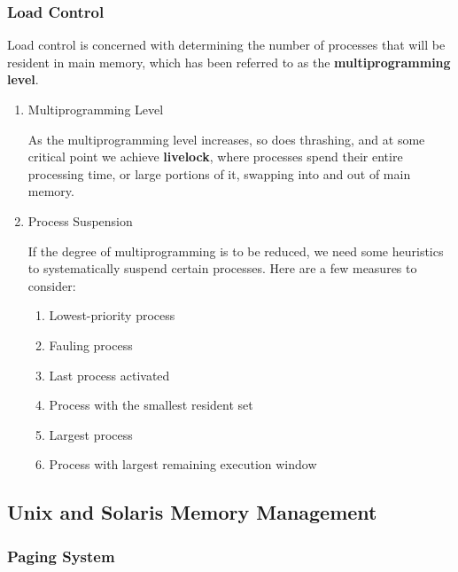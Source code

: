 \documentclass[11pt]{article}
\begin{document}
\subsubsection{Load Control}
\label{sec:orgheadline70}

Load control is concerned with determining the number of processes 
that will be resident in main memory, which has been referred to as 
the \textbf{multiprogramming level}.

\begin{enumerate}
\item Multiprogramming Level
\label{sec:orgheadline62}

As the multiprogramming level increases, so does thrashing, and at some
critical point we achieve \textbf{livelock}, where processes spend their entire
processing time, or large portions of it, swapping into and out of main
memory.

\item Process Suspension
\label{sec:orgheadline69}

If the degree of multiprogramming is to be reduced, we need some heuristics
to systematically suspend certain processes. Here are a few measures to consider:

\begin{enumerate}
\item Lowest-priority process
\label{sec:orgheadline63}

\item Fauling process
\label{sec:orgheadline64}

\item Last process activated
\label{sec:orgheadline65}

\item Process with the smallest resident set
\label{sec:orgheadline66}

\item Largest process
\label{sec:orgheadline67}

\item Process with largest remaining execution window
\label{sec:orgheadline68}
\end{enumerate}
\end{enumerate}

\subsection{Unix and Solaris Memory Management}
\label{sec:orgheadline74}

\subsubsection{Paging System}
\label{sec:orgheadline72}
\end{document}
